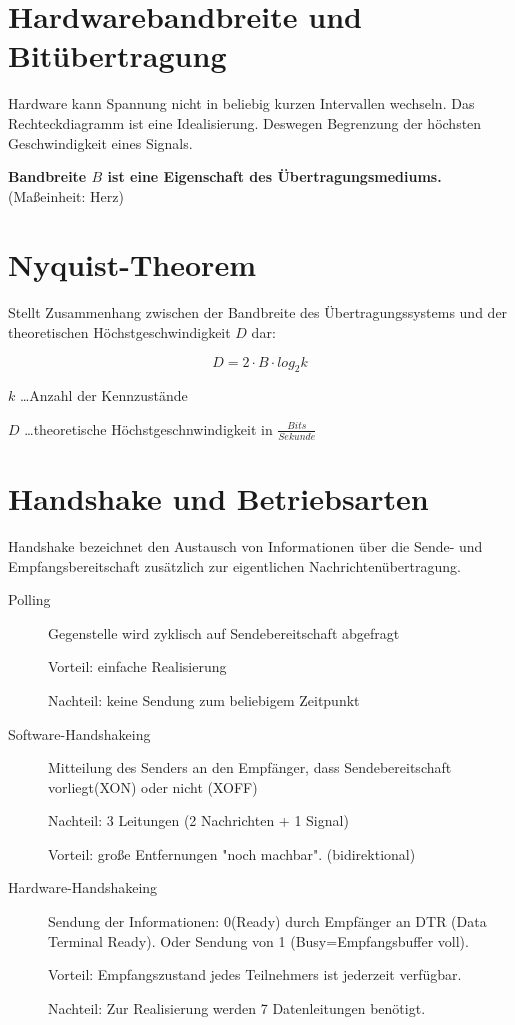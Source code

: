 \section{Hardwarebandbreite und Bitübertragung}

Hardware kann Spannung nicht in beliebig kurzen Intervallen wechseln. Das Rechteckdiagramm ist eine Idealisierung. Deswegen Begrenzung der höchsten Geschwindigkeit eines Signals.


\textbf{Bandbreite $B$ ist eine Eigenschaft des Übertragungsmediums.} (Maßeinheit: Herz)

\section{Nyquist-Theorem}

Stellt Zusammenhang zwischen der Bandbreite des Übertragungssystems und der theoretischen Höchstgeschwindigkeit $D$ dar:

$$ D = 2 \cdot B \cdot log_2 k $$

$k$ \ldots Anzahl der Kennzustände

$D$ \ldots theoretische Höchstgeschnwindigkeit in $\frac{Bits}{Sekunde}$

\section{Handshake und Betriebsarten}

Handshake bezeichnet den Austausch von Informationen über die Sende- und Empfangsbereitschaft zusätzlich zur eigentlichen Nachrichtenübertragung.

\begin{description}
\item[Polling] Gegenstelle wird zyklisch auf Sendebereitschaft abgefragt

Vorteil: einfache Realisierung

Nachteil: keine Sendung zum beliebigem Zeitpunkt
\item[Software-Handshakeing] Mitteilung des Senders an den Empfänger, dass Sendebereitschaft vorliegt(XON) oder nicht (XOFF)

Nachteil: 3 Leitungen (2 Nachrichten + 1 Signal)

Vorteil: große Entfernungen "noch machbar". (bidirektional)
\item[Hardware-Handshakeing] Sendung der Informationen: 0(Ready) durch Empfänger an DTR (Data Terminal Ready). Oder Sendung von 1 (Busy=Empfangsbuffer voll). 

Vorteil: Empfangszustand jedes Teilnehmers ist jederzeit verfügbar. 

Nachteil: Zur Realisierung werden 7 Datenleitungen benötigt. 
\end{description}

